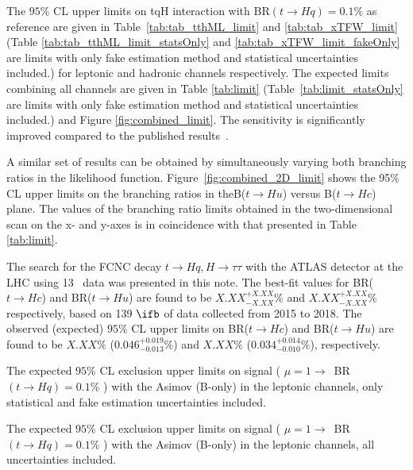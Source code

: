 The $95\%$ CL upper limits on tqH interaction with BR$(t\to Hq)=0.1\%$ as reference are given in Table~\ref{tab:tab_tthML_limit} and \ref{tab:tab_xTFW_limit} (Table \ref{tab:tab_tthML_limit_statsOnly} and \ref{tab:tab_xTFW_limit_fakeOnly} are limits with only fake estimation method and statistical uncertainties included.) for leptonic and hadronic channels respectively. The expected limits combining all channels are given in Table \ref{tab:limit} (Table~\ref{tab:limit_statsOnly} are limits with only fake estimation method and statistical uncertainties included.) and Figure \ref{fig:combined_limit}. The sensitivity is significantly improved compared to the published results~\cite{fcncgmgm,fcncml,fcnctautau}. 

A similar set of results can be obtained by simultaneously varying both branching ratios in the likelihood function. Figure~\ref{fig:combined_2D_limit}  shows the 95\% CL upper limits on the branching ratios in theB($t\rightarrow Hu$) versus B($t\rightarrow Hc$) plane. The values of the branching ratio limits obtained in the two-dimensional scan on the x- and y-axes is in coincidence with that presented in Table \ref{tab:limit}.

The search for the FCNC decay $t\to Hq, H\to\tau\tau$ with the ATLAS detector at the LHC using 13~\TeV{} data was presented in this note. The best-fit values for BR($t\to Hc$) and BR($t\to Hu$) are found to be $X.XX^{+X.XX}_{-X.XX}\%$ and $X.XX^{+X.XX}_{-X.XX}\%$ respectively, based on 139 $\ifb$ of data collected from 2015 to 2018. The observed (expected) $95\%$ CL upper limits on BR($t\to Hc$) and BR($t\to Hu$) are found to be $X.XX\%$ ($0.046^{+0.019}_{-0.013}\%$) and $X.XX\%$ ($0.034^{+0.014}_{-0.010}\%$), respectively.


\begin{table}[htb]
\caption{ The expected $95\%$ CL exclusion upper limits on signal ( $\mu=1\to$~BR$(t\to Hq)=0.1\%$ ) with the Asimov (B-only) in the leptonic channels, only statistical and fake estimation uncertainties included.}

\label{tab:tab_tthML_limit_statsOnly}
\end{table}

\begin{table}[htb]
\caption{ The expected $95\%$ CL exclusion upper limits on signal ( $\mu=1\to$~BR$(t\to Hq)=0.1\%$ ) with the Asimov (B-only) in the leptonic channels, all uncertainties included.}

\label{tab:tab_tthML_limit}
\end{table}

